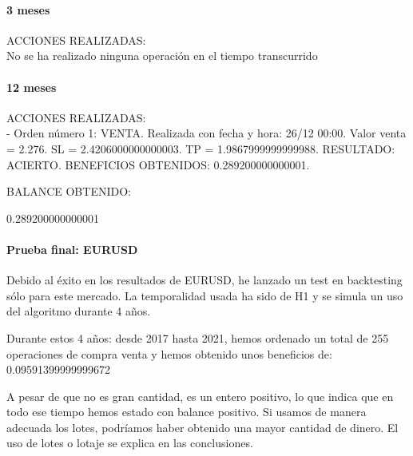 \paragraph{3 meses}

ACCIONES REALIZADAS:\\

No se ha realizado ninguna operación en el tiempo transcurrido

\paragraph{12 meses}

ACCIONES REALIZADAS:\\

- Orden número 1: VENTA. Realizada con fecha y hora: 26/12 00:00. Valor venta = 2.276. SL = 2.4206000000000003. TP = 1.9867999999999988. RESULTADO: ACIERTO. BENEFICIOS OBTENIDOS: 0.289200000000001.\newline


\color{blue}
BALANCE OBTENIDO:\newline

0.289200000000001\newline
\color{black}


\paragraph{Prueba final: EURUSD}

Debido al éxito en los resultados de EURUSD, he lanzado un test en backtesting sólo para este mercado. La temporalidad usada ha sido de H1 y se simula un uso del algoritmo durante 4 años.\newline

Durante estos 4 años: desde 2017 hasta 2021, hemos ordenado un total de 255 operaciones de compra venta y hemos obtenido unos beneficios de: 0.09591399999999672 \newline

A pesar de que no es gran cantidad, es un entero positivo, lo que indica que en todo ese tiempo hemos estado con balance positivo. Si usamos de manera adecuada los lotes, podríamos haber obtenido una mayor cantidad de dinero. El uso de lotes o lotaje se explica en las conclusiones.\newline

